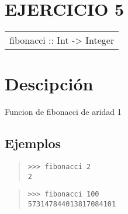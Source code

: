 \section{EJERCICIO 5}
\begin{haddockdesc}
\item[\begin{tabular}{@{}l}
fibonacci :: Int -> Integer
\end{tabular}]
{\haddockbegindoc
\section*{Descipción}
Funcion de fibonacci de aridad 1\par
\subsection*{Ejemplos}
\begin{quote}
{\haddockverb\begin{verbatim}
>>> fibonacci 2
2

\end{verbatim}}
\end{quote}
\begin{quote}
{\haddockverb\begin{verbatim}
>>> fibonacci 100
573147844013817084101

\end{verbatim}}
\end{quote}}
\end{haddockdesc}